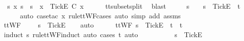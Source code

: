 \begin{isabellebody}
\ {\isachardoublequoteopen}{\isasymexists}\ s{\isacharprime}{\isacharprime}\ x{\isachardot}\ s{\isacharprime}\ {\isacharequal}\ s{\isacharprime}{\isacharprime}\ {\isacharat}\ x\ {\isasymand}\ {\isacharbrackleft}{\isacharbrackleft}Tick{\isacharbrackright}\isactrlsub E{\isacharbrackright}\ {\isasymsubseteq}\isactrlsub C\ x{\isachardoublequoteclose}\isanewline
\ \ \ \ \isamarkupfalse%
\ tt{\isacharunderscore}subset{\isacharunderscore}split{}\ \isamarkupfalse%
\ blast\isanewline
\ \ \isamarkupfalse%
\ \isamarkupfalse%
\ s{\isacharprime}{\isacharprime}\ \ {\isachardoublequoteopen}{\isasymsigma}\ {\isacharequal}\ s{\isacharprime}{\isacharprime}\ {\isacharat}\ {\isacharbrackleft}{\isacharbrackleft}Tick{\isacharbrackright}\isactrlsub E{\isacharbrackright}\ {\isacharat}\ t{\isachardoublequoteclose}\isanewline
\ \ \ \ \isamarkupfalse%
\ {\isacharparenleft}auto{\isacharcomma}\ case{\isacharunderscore}tac\ x\ rule{\isacharcolon}ttWF{\isachardot}cases{\isacharcomma}\ auto\ simp\ add{\isacharcolon}\ {\isasymsigma}{\isacharunderscore}assms{\isacharparenright}\isanewline
\ \ \isamarkupfalse%
\ \isamarkupfalse%
\ {\isachardoublequoteopen}ttWF\ {\isasymsigma}\ {\isasymLongrightarrow}\ {\isasymsigma}\ {\isacharequal}\ s{\isacharprime}{\isacharprime}\ {\isacharat}\ {\isacharbrackleft}{\isacharbrackleft}Tick{\isacharbrackright}\isactrlsub E{\isacharbrackright}{\isachardoublequoteclose}\isanewline
\ \ \isamarkupfalse%
\ auto\isanewline
\ \ \ \ \isamarkupfalse%
\ {\isachardoublequoteopen}ttWF\ {\isacharparenleft}s{\isacharprime}{\isacharprime}\ {\isacharat}\ {\isacharbrackleft}Tick{\isacharbrackright}\isactrlsub E\ {\isacharhash}\ t{\isacharparenright}\ {\isasymLongrightarrow}\ t\ {\isacharequal}\ {\isacharbrackleft}{\isacharbrackright}{\isachardoublequoteclose}\isanewline
\ \ \ \ \ \ \isamarkupfalse%
\ {\isacharparenleft}induct\ s{\isacharprime}{\isacharprime}\ rule{\isacharcolon}ttWF{\isachardot}induct{\isacharcomma}\ auto{\isacharcomma}\ cases\ t{\isacharcomma}\ auto{\isacharparenright}\isanewline
\ \ \isamarkupfalse%
\isanewline
\ \ \isamarkupfalse%
\ \isamarkupfalse%
\ {\isachardoublequoteopen}{\isasymsigma}\ {\isacharequal}\ s{\isacharprime}{\isacharprime}\ {\isacharat}\ {\isacharbrackleft}{\isacharbrackleft}Tick{\isacharbrackright}\isactrlsub E{\isacharbrackright}{\isachardoublequoteclose}\isanewline
\ \ \ \ \isamarkupfalse%

\end{isabellebody}
